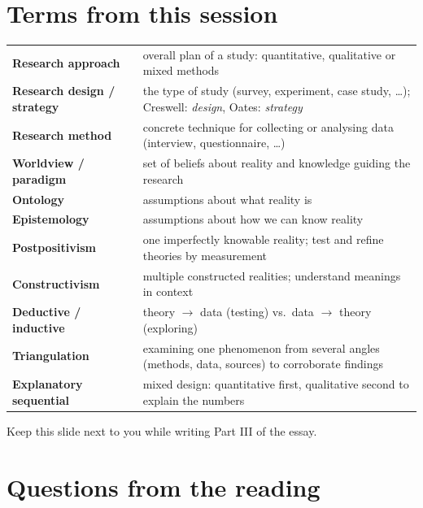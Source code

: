 \documentclass[11pt,a4paper,british,twoside=false,headings=small,chapterprefix=false,numbers=noenddot]{scrbook}
\begin{document}
\section*{Terms from this session}
\begin{center}\small
\footnotesize
  \renewcommand{\arraystretch}{1.12}
  \begin{tabular}{@{}p{3.2cm}p{10.3cm}@{}}
    \toprule
    \textbf{Research approach} & overall plan of a study: quantitative, qualitative or mixed methods\\
    \textbf{Research design / strategy} & the type of study (survey, experiment, case study, \dots); Creswell: \emph{design}, Oates: \emph{strategy}\\
    \textbf{Research method} & concrete technique for collecting or analysing data (interview, questionnaire, \dots)\\
    \textbf{Worldview / paradigm} & set of beliefs about reality and knowledge guiding the research\\
    \textbf{Ontology} & assumptions about what reality is\\
    \textbf{Epistemology} & assumptions about how we can know reality\\
    \textbf{Postpositivism} & one imperfectly knowable reality; test and refine theories by measurement\\
    \textbf{Constructivism} & multiple constructed realities; understand meanings in context\\
    \textbf{Deductive / inductive} & theory $\rightarrow$ data (testing) vs.\ data $\rightarrow$ theory (exploring)\\
    \textbf{Triangulation} & examining one phenomenon from several angles (methods, data, sources) to corroborate findings\\
    \textbf{Explanatory sequential} & mixed design: quantitative first, qualitative second to explain the numbers\\
    \bottomrule
  \end{tabular}
  

  {\color{kgrey}\scriptsize Keep this slide next to you while writing Part III of the essay.}
\end{center}



\section*{Questions from the reading}
\end{document}
